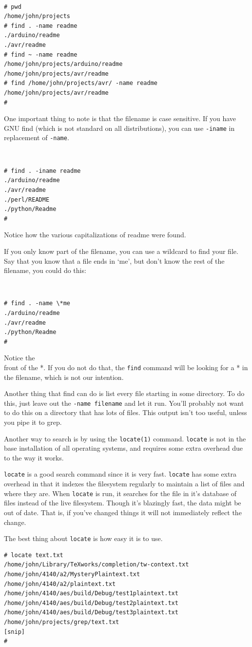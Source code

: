 {\tt
\begin{verbatim}
# pwd
/home/john/projects
# find . -name readme
./arduino/readme
./avr/readme
# find ~ -name readme
/home/john/projects/arduino/readme
/home/john/projects/avr/readme
# find /home/john/projects/avr/ -name readme
/home/john/projects/avr/readme
#
\end{verbatim}
}
One important thing to note is that the filename is case sensitive. If you have 
GNU find (which is not standard on all distributions), you can use {\tt -iname} 
in replacement of {\tt -name}.
{\tt
\begin{verbatim}
# find . -iname readme
./arduino/readme
./avr/readme
./perl/README
./python/Readme
#
\end{verbatim}
}
Notice how the various capitalizations of readme were found.

If you only know part of the filename, you can use a wildcard 
to find your file.  Say that you know that a file ends in `me', 
but don't know the rest of the filename, you could do this:
{\tt
\begin{verbatim}
# find . -name \*me
./arduino/readme
./avr/readme
./python/Readme
#
\end{verbatim}
}
Notice the \\ front of the *.  If you do not do that, the 
{\tt find} command will be looking for a * in the filename, 
which is not our intention.

Another thing that find can do is list every file starting in some 
directory.  To do this, just leave out the {\tt -name filename} 
and let it run. You'll probably not want to do this on a directory 
that has lots of files. This output isn't too useful, unless you 
pipe it to grep.

Another way to search is by using the {\tt locate(1)} command.  
{\tt locate} is not in the base installation of all operating 
systems, and requires some extra overhead due to the way 
it works.

{\tt locate} is a good search command since it is very fast.
{\tt locate} has some extra overhead in that it indexes the 
filesystem regularly to maintain a list of files and where they 
are. When {\tt locate} is run, it searches for the file in it's
database of files instead of the live filesystem. Though it's
blazingly fast, the data might be out of date. That is, if you've
changed things it will not immediately reflect the change.

The best thing about {\tt locate} is how easy it is to use.
{\tt \begin{verbatim}
# locate text.txt
/home/john/Library/TeXworks/completion/tw-context.txt
/home/john/4140/a2/MysteryPlaintext.txt
/home/john/4140/a2/plaintext.txt
/home/john/4140/aes/build/Debug/test1plaintext.txt
/home/john/4140/aes/build/Debug/test2plaintext.txt
/home/john/4140/aes/build/Debug/test3plaintext.txt
/home/john/projects/grep/text.txt
[snip]
#
\end{verbatim}
}

